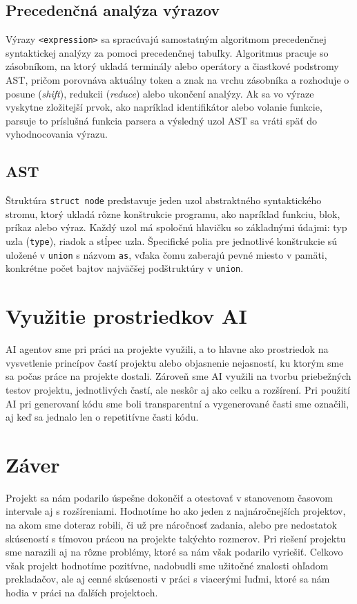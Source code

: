 \documentclass{article}
\begin{document}
   \subsection{Precedenčná analýza výrazov}
        Výrazy \texttt{\textless expression\textgreater} sa spracúvajú samostatným algoritmom precedenčnej syntaktickej analýzy za pomoci precedenčnej tabuľky. Algoritmus pracuje so zásobníkom, na ktorý ukladá terminály alebo operátory a čiastkové podstromy AST, pričom porovnáva aktuálny token a znak na vrchu zásobníka a rozhoduje o posune (\emph{shift}), redukcii (\emph{reduce}) alebo ukončení analýzy. Ak sa vo výraze vyskytne zložitejší prvok, ako napríklad identifikátor alebo volanie funkcie, parsuje to príslušná funkcia parsera a výsledný uzol AST sa vráti späť do vyhodnocovania výrazu.
        
    \subsection{AST}
        Štruktúra \texttt{struct node} predstavuje jeden uzol abstraktného syntaktického stromu, ktorý ukladá rôzne konštrukcie programu, ako napríklad funkciu, blok, príkaz alebo výraz. Každý uzol má spoločnú hlavičku so základnými údajmi: typ uzla (\texttt{type}), riadok a stĺpec uzla. Špecifické polia pre jednotlivé konštrukcie sú uložené v \texttt{union} s názvom \texttt{as}, vďaka čomu zaberajú pevné miesto v pamäti, konkrétne počet bajtov najväčšej podštruktúry v \texttt{union}.

\section{Využitie prostriedkov AI}
    AI agentov sme pri práci na projekte využili, a to hlavne ako prostriedok na vysvetlenie princípov častí projektu alebo objasnenie nejasností, ku ktorým sme sa počas práce na projekte dostali. Zároveň sme AI využili na tvorbu priebežných testov projektu, jednotlivých častí, ale neskôr aj ako celku a rozšírení. Pri použití AI pri generovaní kódu sme boli transparentní a vygenerované časti sme označili, aj keď sa jednalo len o repetitívne časti kódu.
\section{Záver}
    Projekt sa nám podarilo úspešne dokončiť a otestovať v stanovenom časovom intervale aj s rozšíreniami. Hodnotíme ho ako jeden z najnáročnejších projektov, na akom sme doteraz robili, či už pre náročnosť zadania, alebo pre nedostatok skúseností s tímovou prácou na projekte takýchto rozmerov. Pri riešení projektu sme narazili aj na rôzne problémy, ktoré sa nám však podarilo vyriešiť. Celkovo však projekt hodnotíme pozitívne, nadobudli sme užitočné znalosti ohľadom prekladačov, ale aj cenné skúsenosti v práci s viacerými ľuďmi, ktoré sa nám hodia v práci na ďalších projektoch.
\end{document}
